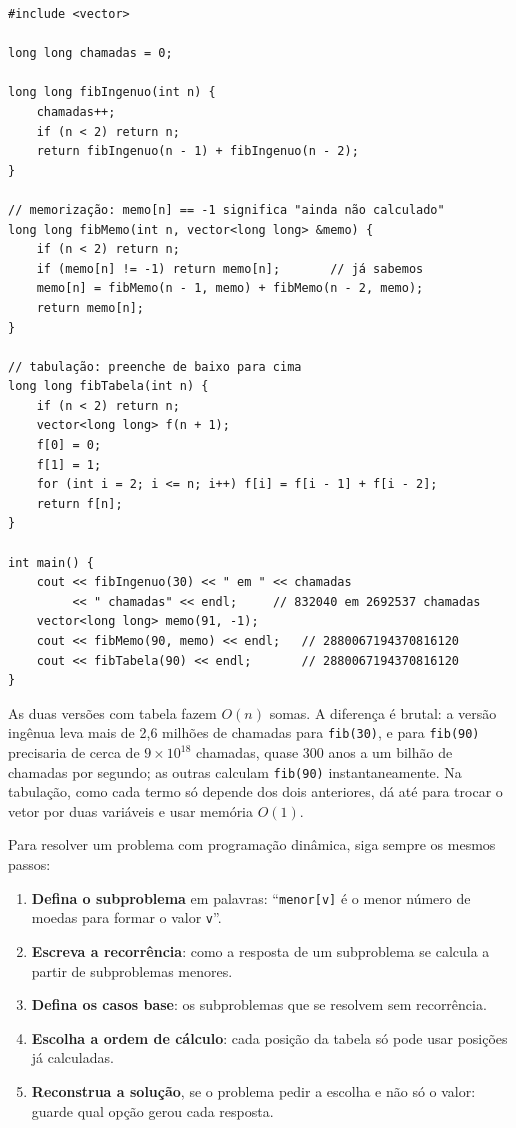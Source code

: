 \begin{codigo}
\begin{Verbatim}[breaklines=true, breaksymbolleft={}, fontsize=\footnotesize]
#include <vector>

long long chamadas = 0;

long long fibIngenuo(int n) {
    chamadas++;
    if (n < 2) return n;
    return fibIngenuo(n - 1) + fibIngenuo(n - 2);
}

// memorização: memo[n] == -1 significa "ainda não calculado"
long long fibMemo(int n, vector<long long> &memo) {
    if (n < 2) return n;
    if (memo[n] != -1) return memo[n];       // já sabemos
    memo[n] = fibMemo(n - 1, memo) + fibMemo(n - 2, memo);
    return memo[n];
}

// tabulação: preenche de baixo para cima
long long fibTabela(int n) {
    if (n < 2) return n;
    vector<long long> f(n + 1);
    f[0] = 0;
    f[1] = 1;
    for (int i = 2; i <= n; i++) f[i] = f[i - 1] + f[i - 2];
    return f[n];
}

int main() {
    cout << fibIngenuo(30) << " em " << chamadas
         << " chamadas" << endl;     // 832040 em 2692537 chamadas
    vector<long long> memo(91, -1);
    cout << fibMemo(90, memo) << endl;   // 2880067194370816120
    cout << fibTabela(90) << endl;       // 2880067194370816120
}
\end{Verbatim}
\end{codigo}

As duas versões com tabela fazem $O(n)$ somas. A diferença é brutal: a versão ingênua leva mais de 2,6 milhões de chamadas para \texttt{fib(30)}, e para \texttt{fib(90)} precisaria de cerca de $9 \times 10^{18}$ chamadas, quase 300 anos a um bilhão de chamadas por segundo; as outras calculam \texttt{fib(90)} instantaneamente. Na tabulação, como cada termo só depende dos dois anteriores, dá até para trocar o vetor por duas variáveis e usar memória $O(1)$.

Para resolver um problema com programação dinâmica, siga sempre os mesmos passos:

\begin{enumerate}
  \item \textbf{Defina o subproblema} em palavras: ``\texttt{menor[v]} é o menor número de moedas para formar o valor \texttt{v}''.
  \item \textbf{Escreva a recorrência}: como a resposta de um subproblema se calcula a partir de subproblemas menores.
  \item \textbf{Defina os casos base}: os subproblemas que se resolvem sem recorrência.
  \item \textbf{Escolha a ordem de cálculo}: cada posição da tabela só pode usar posições já calculadas.
  \item \textbf{Reconstrua a solução}, se o problema pedir a escolha e não só o valor: guarde qual opção gerou cada resposta.
\end{enumerate}


